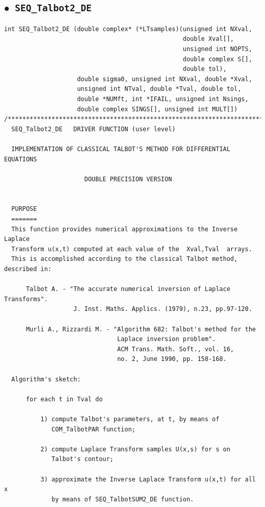 \documentclass[a4paper,10pt]{report}%
\begin{document}
\subsection{\texorpdfstring{$\boldsymbol{\bullet}$}{ - }{\tt\ SEQ\_Talbot2\_DE}}
\begin{lstlisting}
int SEQ_Talbot2_DE (double complex* (*LTsamples)(unsigned int NXval,
                                                 double Xval[],
                                                 unsigned int NOPTS,
                                                 double complex S[],
                                                 double tol),
                    double sigma0, unsigned int NXval, double *Xval,
                    unsigned int NTval, double *Tval, double tol,
                    double *NUMft, int *IFAIL, unsigned int Nsings,
                    double complex SINGS[], unsigned int MULT[])
/*****************************************************************************
  SEQ_Talbot2_DE   DRIVER FUNCTION (user level)

  IMPLEMENTATION OF CLASSICAL TALBOT'S METHOD FOR DIFFERENTIAL EQUATIONS

                      DOUBLE PRECISION VERSION


  PURPOSE
  =======
  This function provides numerical approximations to the Inverse Laplace
  Transform u(x,t) computed at each value of the  Xval,Tval  arrays.
  This is accomplished according to the classical Talbot method, described in:

      Talbot A. - "The accurate numerical inversion of Laplace Transforms".
                   J. Inst. Maths. Applics. (1979), n.23, pp.97-120.

      Murli A., Rizzardi M. - "Algorithm 682: Talbot's method for the
                               Laplace inversion problem".
                               ACM Trans. Math. Soft., vol. 16,
                               no. 2, June 1990, pp. 158-168.

  Algorithm's sketch:

      for each t in Tval do

          1) compute Talbot's parameters, at t, by means of
             COM_TalbotPAR function;

          2) compute Laplace Transform samples U(x,s) for s on
             Talbot's contour;

          3) approximate the Inverse Laplace Transform u(x,t) for all x
             by means of SEQ_TalbotSUM2_DE function.



\end{lstlisting}
\end{document}
